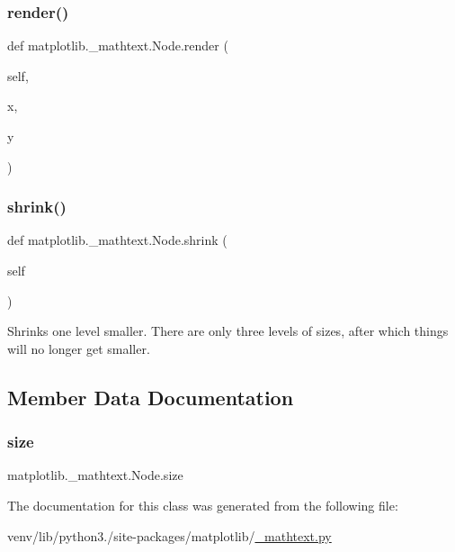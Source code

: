 \subsubsection{\texorpdfstring{render()}{render()}}
{\footnotesize\ttfamily def matplotlib.\+\_\+mathtext.\+Node.\+render (\begin{DoxyParamCaption}\item[{}]{self,  }\item[{}]{x,  }\item[{}]{y }\end{DoxyParamCaption})}

\mbox{\label{classmatplotlib_1_1__mathtext_1_1Node_a75423414e620c37f376678a02c8a6b26}} 
\subsubsection{\texorpdfstring{shrink()}{shrink()}}
{\footnotesize\ttfamily def matplotlib.\+\_\+mathtext.\+Node.\+shrink (\begin{DoxyParamCaption}\item[{}]{self }\end{DoxyParamCaption})}

\begin{DoxyVerb}Shrinks one level smaller.  There are only three levels of
sizes, after which things will no longer get smaller.
\end{DoxyVerb}
 

\subsection{Member Data Documentation}
\mbox{\label{classmatplotlib_1_1__mathtext_1_1Node_a200d9dd215d8f72b36efa8c78c7c6f2e}} 
\subsubsection{\texorpdfstring{size}{size}}
{\footnotesize\ttfamily matplotlib.\+\_\+mathtext.\+Node.\+size}



The documentation for this class was generated from the following file\+:\begin{DoxyCompactItemize}
\item 
venv/lib/python3./site-\/packages/matplotlib/\hyperlink{__mathtext_8py}{\+\_\+mathtext.\+py}\end{DoxyCompactItemize}
